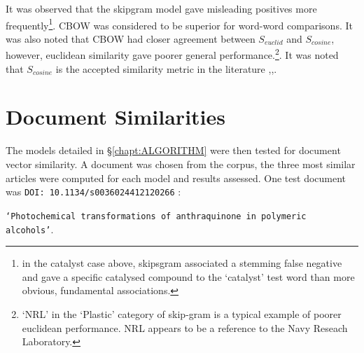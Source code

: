 It was observed that the skipgram model gave misleading positives more frequently\footnote{in the catalyst case above, skipsgram associated a stemming false negative and gave a specific catalysed compound to the `catalyst' test word than more obvious, fundamental associations.}. CBOW  was considered to be superior for word-word comparisons. It was also noted that CBOW had closer agreement between $S_{euclid}$ and $S_{cosine}$, however, euclidean similarity gave poorer general performance.\footnote{`NRL' in the `Plastic' category of skip-gram is a typical example of poorer euclidean performance. NRL appears to be a reference to the Navy Reseach Laboratory. }. It was noted that $S_{cosine}$ is the accepted similarity metric in the literature \cite{word2vec1},\cite{word2vec2},\cite{doc2vec}.

\section{Document Similarities}
The models detailed in \S\ref{chapt:ALGORITHM} were then tested for document vector similarity. A document was chosen from the corpus, the three most similar articles were computed for each model and results assessed. One test document was \texttt{DOI: 10.1134/s0036024412120266} \cite{docassay}:


\texttt{`Photochemical transformations of anthraquinone in polymeric alcohols'}.

